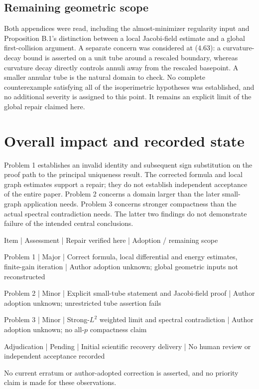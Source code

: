 \documentclass[10pt]{article}
\begin{document}
\subsection*{Remaining geometric scope}
Both appendices were read, including the almost-minimizer regularity input and Proposition B.1’s distinction between a local Jacobi-field estimate and a global first-collision argument. A separate concern was considered at (4.63): a curvature-decay bound is asserted on a unit tube around a rescaled boundary, whereas curvature decay directly controls annuli away from the rescaled basepoint. A smaller annular tube is the natural domain to check. No complete counterexample satisfying all of the isoperimetric hypotheses was established, and no additional severity is assigned to this point. It remains an explicit limit of the global repair claimed here.\par
\section*{Overall impact and recorded state}
Problem 1 establishes an invalid identity and subsequent sign substitution on the proof path to the principal uniqueness result. The corrected formula and local graph estimates support a repair; they do not establish independent acceptance of the entire paper. Problem 2 concerns a domain larger than the later small-graph application needs. Problem 3 concerns stronger compactness than the actual spectral contradiction needs. The latter two findings do not demonstrate failure of the intended central conclusions.\par
Item | Assessment | Repair verified here | Adoption / remaining scope\par
Problem 1 | Major | Correct formula, local differential and energy estimates, finite-gain iteration | Author adoption unknown; global geometric inputs not reconstructed\par
Problem 2 | Minor | Explicit small-tube statement and Jacobi-field proof | Author adoption unknown; unrestricted tube assertion fails\par
Problem 3 | Minor | Strong-\(L^2\) weighted limit and spectral contradiction | Author adoption unknown; no all-\(p\) compactness claim\par
Adjudication | Pending | Initial scientific recovery delivery | No human review or independent acceptance recorded\par
No current erratum or author-adopted correction is asserted, and no priority claim is made for these observations.\par
\end{document}
